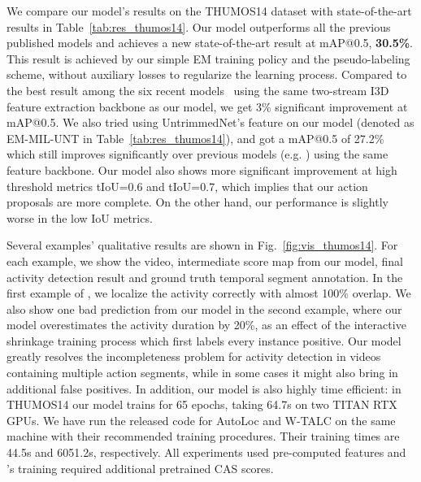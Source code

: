\documentclass[runningheads]{llncs}
\begin{document}
We compare our model's results on the THUMOS14 dataset with state-of-the-art results in Table~\ref{tab:res_thumos14}.
Our model outperforms all the previous published models and achieves a new state-of-the-art result at mAP@0.5, \textbf{30.5\%}. This result is achieved by our simple EM training policy and the pseudo-labeling scheme, without auxiliary losses to regularize the learning process. 
Compared to the best result among the six recent models~\cite{alwassel2019refineloc,narayan20193c,nguyen2018weakly,nguyen2019weakly,paul2018w,yu2019temporal} using the same two-stream I3D feature extraction backbone as our model, we get 3\% significant improvement at mAP@0.5. 
We also tried using UntrimmedNet's feature on our model (denoted as EM-MIL-UNT in Table~\ref{tab:res_thumos14}), and got a mAP@0.5 of 27.2\% which still improves significantly over previous models (e.g. \cite{liu2019weakly,shou2018autoloc,wang2017untrimmednets}) using the same feature backbone.
Our model also shows more significant improvement at high threshold metrics  tIoU=0.6 and tIoU=0.7, which implies that our action proposals are more complete. On the other hand, our performance is slightly worse in the low IoU metrics.


\smallskip
Several examples' qualitative results are shown in Fig.~\ref{fig:vis_thumos14}.
For each example, we show the video, intermediate score map  from our model, final activity detection result and ground truth temporal segment annotation.
In the first example of , we localize the activity correctly with almost 100\% overlap. We also show one bad prediction from our model in the second example, where our model overestimates the  activity duration by 20\%, as an effect of the interactive shrinkage training process which first labels every instance positive. Our model greatly resolves the incompleteness problem for activity detection in videos containing multiple action segments, while in some cases it might also bring in additional false positives. In addition, our model is also highly time efficient: in THUMOS14 our model trains for 65 epochs, taking 64.7s on two TITAN RTX GPUs. We have run the released code for AutoLoc \cite{shou2018autoloc} and W-TALC \cite{paul2018w} on the same machine with their recommended training procedures. Their training times are 44.5s and 6051.2s, respectively. All experiments used pre-computed features and \cite{shou2018autoloc}'s training required additional pretrained CAS scores.
\end{document}
